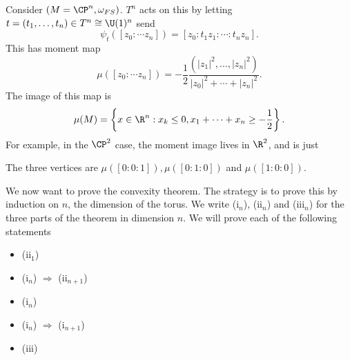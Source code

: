 \documentclass[a4paper]{article}
\begin{document}
\begin{eg}
  Consider $(M = \CP^n, \omega_{FS})$. $T^n$ acts on this by letting $t = (t_1, \ldots, t_n) \in T^n \cong \U(1)^n$ send
  \[
    \psi_t([z_0: \cdots z_n]) = [z_0: t_1 z_1: \cdots :t_n z_n].
  \]
  This has moment map
  \[
    \mu([z_0: \cdots z_n]) = -\frac{1}{2} \frac{(|z_1|^2, \ldots, |z_n|^2)}{|z_0|^2 + \cdots + |z_n|^2}.
  \]
  The image of this map is
  \[
    \mu(M) = \left\{x \in \R^n: x_k \leq 0, x_1 + \cdots + x_n \geq -\frac{1}{2}\right\}.
  \]
  For example, in the $\CP^2$ case, the moment image lives in $\R^2$, and is just 
  \begin{center}
  \end{center}
  The three vertices are $\mu([0:0:1]), \mu([0:1:0])$ and $\mu([1:0:0])$.
\end{eg}

We now want to prove the convexity theorem. The strategy is to prove this by induction on $n$, the dimension of the torus. We write (i$_n$), (ii$_n$) and (iii$_n$) for the three parts of the theorem in dimension $n$. We will prove each of the following statements
\begin{itemize}
  \item (ii$_1$)
  \item (i$_n$) $\Rightarrow$ (ii$_{n + 1}$)
  \item (i$_n$)
  \item (i$_n$) $\Rightarrow$ (i$_{n + 1}$)
  \item (iii)
\end{itemize}
\end{document}
